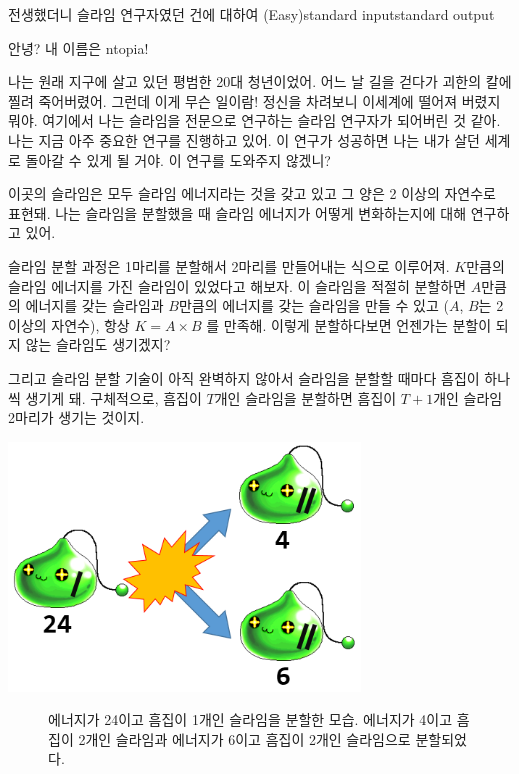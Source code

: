 \begin{problem}{전생했더니 슬라임 연구자였던 건에 대하여 (Easy)}{standard input}{standard output}

안녕? 내 이름은 ntopia!

나는 원래 지구에 살고 있던 평범한 20대 청년이었어. 어느 날 길을 걷다가 괴한의 칼에 찔려
죽어버렸어. 그런데 이게 무슨 일이람! 정신을 차려보니 이세계에 떨어져 버렸지 뭐야.
여기에서 나는 슬라임을 전문으로 연구하는 슬라임 연구자가 되어버린 것 같아.
나는 지금 아주 중요한 연구를 진행하고 있어. 이 연구가 성공하면 나는 내가 살던 세계로
돌아갈 수 있게 될 거야. 이 연구를 도와주지 않겠니?

이곳의 슬라임은 모두 슬라임 에너지라는 것을 갖고 있고 그 양은 2 이상의 자연수로 표현돼.
나는 슬라임을 분할했을 때 슬라임 에너지가 어떻게 변화하는지에 대해 연구하고 있어.

슬라임 분할 과정은 1마리를 분할해서 2마리를 만들어내는 식으로 이루어져.
$K$만큼의 슬라임 에너지를 가진 슬라임이 있었다고 해보자. 이 슬라임을 적절히 분할하면
$A$만큼의 에너지를 갖는 슬라임과
$B$만큼의 에너지를 갖는 슬라임을 만들 수 있고 ($A$, $B$는 2 이상의 자연수),
항상 $K = A \times B$ 를 만족해.
이렇게 분할하다보면 언젠가는 분할이 되지 않는 슬라임도 생기겠지?

그리고 슬라임 분할 기술이 아직 완벽하지 않아서 슬라임을 분할할 때마다
흠집이 하나씩 생기게 돼. 구체적으로, 흠집이 $T$개인 슬라임을 분할하면
흠집이 $T+1$개인 슬라임 2마리가 생기는 것이지.

\begin{center}
  \includegraphics[width=0.7\textwidth]{slime_divide.png}
  \begin{figure}[!h]
  \captionsetup{labelformat=empty,justification=centering}
  \caption{에너지가 24이고 흠집이 1개인 슬라임을 분할한 모습. 에너지가 4이고 흠집이 2개인 슬라임과 에너지가 6이고 흠집이 2개인 슬라임으로 분할되었다.}
  \end{figure}
\end{center}


\end{problem}
